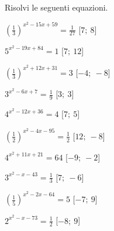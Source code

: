 \begin{esercizio}
\begin{multicols}{2}
\begin{enumeratea}
 \end{enumeratea}
\end{multicols}
\end{esercizio}


\begin{esercizio}\label{ese:}
 Risolvi le seguenti equazioni.
\begin{multicols}{2}
 \begin{enumeratea}
  \item  \(\left(\frac{1}{3}\right)^{x^2 -15 x +59} = \frac{1}{27}\)
   \hfill [\(7;~8\)]
  \item  \(5^{x^2 -19 x +84} = 1\)
   \hfill [\(7;~12\)]
  \item  \(\left(\frac{1}{3}\right)^{x^2 +12 x +31} = 3\)
   \hfill [\(-4;~-8\)]
  \item  \(3^{x^2 -6 x +7} = \frac{1}{9}\)
   \hfill [\(3;~3\)]
  \item  \(4^{x^2 -12 x +36} = 4\)
   \hfill [\(7;~5\)]
  \item  \(\left(\frac{1}{2}\right)^{x^2 -4 x -95} = \frac{1}{2}\)
   \hfill [\(12;~-8\)]
  \item  \(4^{x^2 +11 x +21} = 64\)
   \hfill [\(-9;~-2\)]
  \item  \(3^{x^2 - x -43} = \frac{1}{3}\)
   \hfill [\(7;~-6\)]
  \item  \(\left(\frac{1}{5}\right)^{x^2 -2 x -64} = 5\)
   \hfill [\(-7;~9\)]
  \item  \(2^{x^2 - x -73} = \frac{1}{2}\)
   \hfill [\(-8;~9\)]

\end{enumeratea}
\end{multicols}
\end{esercizio}
